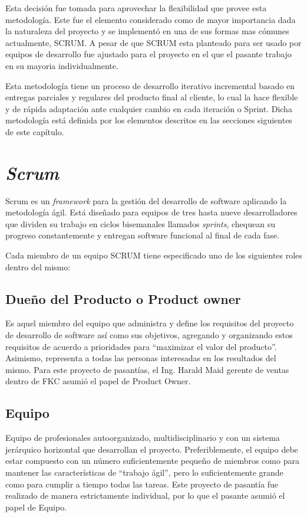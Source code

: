 Esta decisión fue tomada para aprovechar la flexibilidad que provee esta metodología. Este fue el elemento considerado como de mayor importancia dada la naturaleza del proyecto y se implementó en una de sus formas mas cómunes actualmente, SCRUM. A pesar de que SCRUM esta planteado para ser usado por equipos de desarrollo fue ajustado para el proyecto en el que el pasante trabajo en su mayoria individualmente.

Esta metodología tiene un proceso de desarrollo iterativo incremental basado en entregas parciales y regulares del producto final al cliente, lo cual la hace flexible y de rápida adaptación ante cualquier cambio en cada iteración o Sprint. Dicha metodología está definida por los elementos descritos en las secciones siguientes de este capítulo.

\section{\emph{Scrum}}

Scrum es un \emph{framework} para la gestión del desarrollo de software aplicando la metodología ágil. Está diseñado para equipos de tres hasta nueve desarrolladores que dividen su trabajo en ciclos bisemanales llamados \emph{sprints}, chequean su progreso constantemente y entregan software funcional al final de cada fase.

Cada miembro de un equipo SCRUM tiene especificado uno de los siguientes roles dentro del mismo:

\subsection{Dueño del Producto o Product owner}
Es aquel miembro del equipo que administra y define los requisitos del proyecto de desarrollo de software así como sus objetivos, agregando y organizando estos requisitos de acuerdo a prioridades para “maximizar el valor del producto”. Asimismo, representa a todas las personas interesadas en los resultados del mismo.
Para este proyecto de pasantías, el Ing. Harald Maid gerente de ventas dentro de FKC asumió el papel de Product Owner.

\subsection{Equipo}
Equipo de profesionales autoorganizado, multidisciplinario y con un sistema jerárquico horizontal que desarrollan el proyecto. Preferiblemente, el equipo debe estar compuesto con un número suficientemente pequeño de miembros como para mantener las características de “trabajo ágil”, pero lo suficientemente grande como para cumplir a tiempo todas las tareas.
Este proyecto de pasantía fue realizado de manera estrictamente individual, por lo que el pasante asumió el papel de Equipo.

